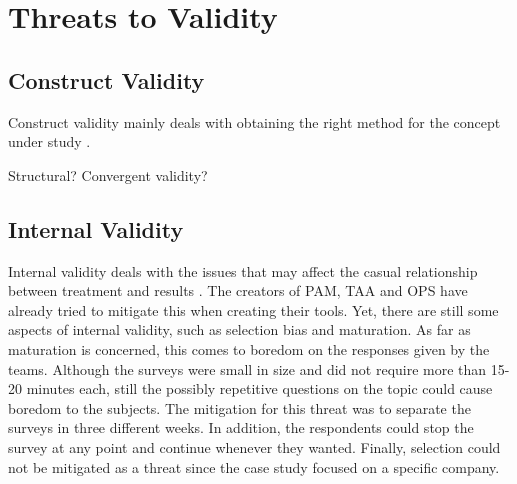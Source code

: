 \section{Threats to Validity}

\subsection{Construct Validity}
Construct validity mainly deals with obtaining the right method for the concept under study \cite{Wohlin}.

Structural?
Convergent validity?

%
%
%
%
%


\subsection{Internal Validity}
Internal validity deals with the issues that may affect the casual relationship between treatment and results \cite{Wohlin}. The creators of \ac{PAM}, \ac{TAA} and \ac{OPS} have already tried to mitigate this when creating their tools. Yet, there are still some aspects of internal validity, such as selection bias and maturation. As far as maturation is concerned, this comes to boredom on the responses given by the teams. Although the surveys were small in size and did not require more than 15-20 minutes each, still the possibly repetitive questions on the topic could cause boredom to the subjects. The mitigation for this threat was to separate the surveys in three different weeks. In addition, the respondents could stop the survey at any point and continue whenever they wanted. Finally, selection could not be mitigated as a threat since the case study focused on a specific company.

